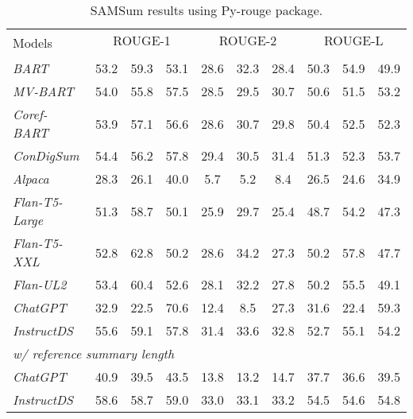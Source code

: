 \documentclass[11pt]{article}
\begin{document}
\begin{table*}[t]
        \centering
        \begin{adjustbox}{width=0.90\textwidth,center}
        \begin{tabular}{| l | c  c  c | c  c  c | c  c  c |}
        \toprule
        
        \multirow{2}{*}{Models} & \multicolumn{3}{c}{ROUGE-1} & \multicolumn{3}{c}{ROUGE-2} & \multicolumn{3}{c|}{ROUGE-L} \\
        \cline{2-10}
         &  &  &  &  &  &  &  &  &  \\
        \hline
        \emph{BART} & 53.2 & 59.3 & 53.1 & 28.6 & 32.3 & 28.4 & 50.3 & 54.9 & 49.9 \\
        \emph{MV-BART} & 54.0 & 55.8 & 57.5 & 28.5 & 29.5 & 30.7 & 50.6 & 51.5 & 53.2 \\
        \emph{Coref-BART} & 53.9 & 57.1 & 56.6 & 28.6 & 30.7 & 29.8 & 50.4 & 52.5 & 52.3 \\
        \emph{ConDigSum} & 54.4 & 56.2 & 57.8 & 29.4 & 30.5 & 31.4 & 51.3 & 52.3 & 53.7 \\
        \hline
        \emph{Alpaca} & 28.3 & 26.1 & 40.0 & 5.7 & 5.2 & 8.4 & 26.5 & 24.6 & 34.9 \\
        \emph{Flan-T5-Large} & 51.3 & 58.7 & 50.1 & 25.9 & 29.7 & 25.4 & 48.7 & 54.2 & 47.3 \\
        \emph{Flan-T5-XXL} & 52.8 & 62.8 & 50.2 & 28.6 & 34.2 & 27.3 & 50.2 & 57.8 & 47.7 \\
        \emph{Flan-UL2} & 53.4 & 60.4 & 52.6 & 28.1 & 32.2 & 27.8 & 50.2 & 55.5 & 49.1 \\
        \emph{ChatGPT} & 32.9 & 22.5 & 70.6 & 12.4 & 8.5 & 27.3 & 31.6 & 22.4 & 59.3 \\
        \hline
        \emph{InstructDS} & 55.6 & 59.1 & 57.8 & 31.4 & 33.6 & 32.8 & 52.7 & 55.1 & 54.2 \\ \hline \hline
        \multicolumn{10}{|l|}{\emph{w/ reference summary length}}\\\hline 
        \emph{ChatGPT} & 40.9 & 39.5 & 43.5 & 13.8 & 13.2 & 14.7 & 37.7 & 36.6 & 39.5 \\
        \emph{InstructDS} & 58.6 & 58.7 & 59.0 & 33.0 & 33.1 & 33.2 & 54.5 & 54.6 & 54.8 \\
        \bottomrule
        \end{tabular}
        \end{adjustbox}
        \caption{SAMSum results using Py-rouge package.}
        \label{tab:appendix_samsum_results}
    \end{table*}
\end{document}
